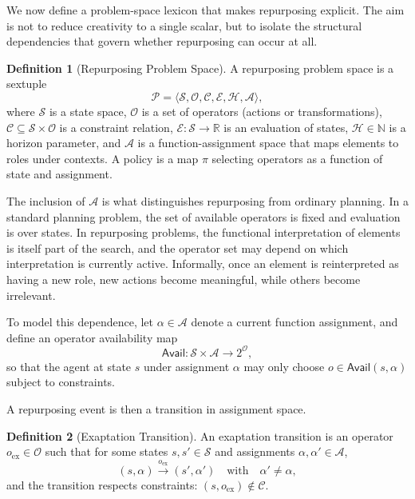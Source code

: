 \documentclass[11pt]{article}
\theoremstyle{definition}
\newtheorem{definition}{Definition}
\begin{document}
We now define a problem-space lexicon that makes repurposing explicit. The aim is not to reduce creativity to a single scalar, but to isolate the structural dependencies that govern whether repurposing can occur at all.

\begin{definition}[Repurposing Problem Space]
A repurposing problem space is a sextuple
\[
\mathcal{P}=\langle \mathcal{S}, \mathcal{O}, \mathcal{C}, \mathcal{E}, \mathcal{H}, \mathcal{A}\rangle,
\]
where $\mathcal{S}$ is a state space, $\mathcal{O}$ is a set of operators (actions or transformations), $\mathcal{C}\subseteq \mathcal{S}\times \mathcal{O}$ is a constraint relation, $\mathcal{E}:\mathcal{S}\to \mathbb{R}$ is an evaluation of states, $\mathcal{H}\in\mathbb{N}$ is a horizon parameter, and $\mathcal{A}$ is a function-assignment space that maps elements to roles under contexts. A policy is a map $\pi$ selecting operators as a function of state and assignment.
\end{definition}

The inclusion of $\mathcal{A}$ is what distinguishes repurposing from ordinary planning. In a standard planning problem, the set of available operators is fixed and evaluation is over states. In repurposing problems, the functional interpretation of elements is itself part of the search, and the operator set may depend on which interpretation is currently active. Informally, once an element is reinterpreted as having a new role, new actions become meaningful, while others become irrelevant.

To model this dependence, let $\alpha\in\mathcal{A}$ denote a current function assignment, and define an operator availability map
\[
\mathsf{Avail}:\mathcal{S}\times \mathcal{A}\to 2^{\mathcal{O}},
\]
so that the agent at state $s$ under assignment $\alpha$ may only choose $o\in \mathsf{Avail}(s,\alpha)$ subject to constraints.

A repurposing event is then a transition in assignment space.

\begin{definition}[Exaptation Transition]
An exaptation transition is an operator $o_{\mathrm{ex}}\in \mathcal{O}$ such that for some states $s,s'\in\mathcal{S}$ and assignments $\alpha,\alpha'\in\mathcal{A}$,
\[
(s,\alpha)\xrightarrow{o_{\mathrm{ex}}}(s',\alpha') \quad \text{with} \quad \alpha'\neq \alpha,
\]
and the transition respects constraints: $(s,o_{\mathrm{ex}})\notin \mathcal{C}$.
\end{definition}
\end{document}
